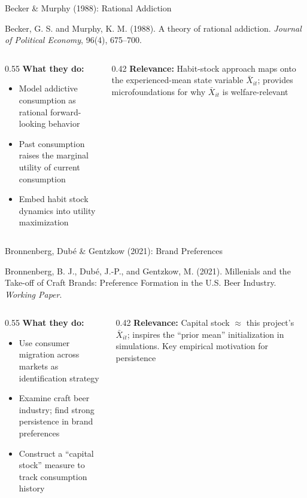 \documentclass[aspectratio=169,professionalfonts]{beamer}
\newcommand{\hl}[1]{\textbf{\textcolor{UGARed}{#1}}}
\begin{document}
\begin{frame}{Becker \& Murphy (1988): Rational Addiction}
  \begin{tcolorbox}[colback=red!5!white, colframe=UGARed, title=\textbf{Citation}]
    Becker, G. S. and Murphy, K. M. (1988). A theory of rational addiction.
    \textit{Journal of Political Economy}, 96(4), 675--700.
  \end{tcolorbox}
  \vspace{6pt}
  \begin{columns}[T]
    \begin{column}{0.55\textwidth}
      \hl{What they do:}
      \begin{itemize}
        \item Model addictive consumption as rational forward-looking behavior
        \item Past consumption raises the marginal utility of current consumption
        \item Embed habit stock dynamics into utility maximization
      \end{itemize}
    \end{column}
    \begin{column}{0.42\textwidth}
      \hl{Relevance:} Habit-stock approach maps onto the experienced-mean state variable
      $\bar{X}_{it}$; provides microfoundations for why $\bar{X}_{it}$ is welfare-relevant
    \end{column}
  \end{columns}
\end{frame}

\begin{frame}{Bronnenberg, Dub\'e \& Gentzkow (2021): Brand Preferences}
  \begin{tcolorbox}[colback=red!5!white, colframe=UGARed, title=\textbf{Citation}]
    Bronnenberg, B. J., Dub\'e, J.-P., and Gentzkow, M. (2021). Millenials and the Take-off of Craft Brands: Preference Formation in the U.S. Beer Industry. \\
    \textit{Working Paper}.
  \end{tcolorbox}
  \vspace{6pt}
  \begin{columns}[T]
    \begin{column}{0.55\textwidth}
      \hl{What they do:}
      \begin{itemize}
        \item Use consumer migration across markets as identification strategy
        \item Examine craft beer industry; find strong persistence in brand preferences
        \item Construct a ``capital stock'' measure to track consumption history
      \end{itemize}
    \end{column}
    \begin{column}{0.42\textwidth}
      \hl{Relevance:} Capital stock $\approx$ this project's $\bar{X}_{it}$; inspires
      the ``prior mean'' initialization in simulations. Key empirical motivation for persistence
    \end{column}
  \end{columns}
\end{frame}
\end{document}
